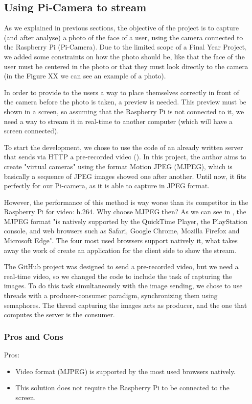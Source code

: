 	\subsection{Using Pi-Camera to stream}
	As we explained in previous sections, the objective of the project is to capture (and after analyse) a photo of the face of a user, using the camera connected to the Raspberry Pi (Pi-Camera). Due to the limited scope of a Final Year Project, we added some constraints on how the photo should be, like that the face of the user must be centered in the photo or that they must look directly to the camera (in the Figure XX we can see an example of a photo). 

	In order to provide to the users a way to place themselves correctly in front of the camera before the photo is taken, a preview is needed.	This preview must be shown in a screen, so assuming that the Raspberry Pi is not connected to it, we need a way to stream it in real-time to another computer (which will have a screen connected).

	To start the development, we chose to use the code of an already written server that sends via HTTP a pre-recorded video (\cite{mjpeg_server_base_code}). In this project, the author aims to create "virtual cameras" using the format Motion JPEG (MJPEG), which is basically a sequence of JPEG images showed one after another. Until now, it fits perfectly for our Pi-camera, as it is able to capture in JPEG format.

	However, the performance of this method is way worse than its competitor in the Raspberry Pi for video: h.264. Why choose MJPEG then? As we can see in \cite{mjpeg_format_info}, the MJPEG format "is natively supported by the QuickTime Player, the PlayStation console, and web browsers such as Safari, Google Chrome, Mozilla Firefox and Microsoft Edge". The four most used browsers support natively it, what takes away the work of create an application for the client side to show the stream. 

	The GitHub project was designed to send a pre-recorded video, but we need a real-time video, so we changed the code to include the task of capturing the images. To do this task simultaneously with the image sending, we chose to use threads with a producer-consumer paradigm, synchronizing them using semaphores. The thread capturing the images acts as producer, and the one that computes the server is the consumer.    

		\subsubsection{Pros and Cons}
		Pros:
		\begin{itemize}
			\item Video format (MJPEG) is supported by the most used browsers natively.
			\item This solution does not require the Raspberry Pi to be connected to the screen. 
		\end{itemize}

